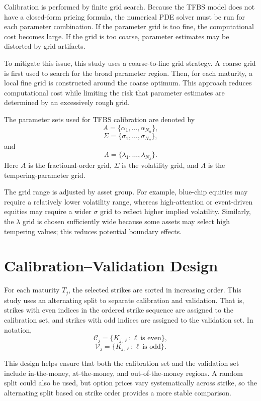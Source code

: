 \documentclass[11pt,a4paper]{report}
\begin{document}
Calibration is performed by finite grid search. Because the TFBS model does not have a closed-form pricing formula, the numerical PDE solver must be run for each parameter combination. If the parameter grid is too fine, the computational cost becomes large. If the grid is too coarse, parameter estimates may be distorted by grid artifacts.

To mitigate this issue, this study uses a coarse-to-fine grid strategy. A coarse grid is first used to search for the broad parameter region. Then, for each maturity, a local fine grid is constructed around the coarse optimum. This approach reduces computational cost while limiting the risk that parameter estimates are determined by an excessively rough grid.

The parameter sets used for TFBS calibration are denoted by
\[
A=\{\alpha_1,\dots,\alpha_{N_\alpha}\},
\]
\[
\Sigma=\{\sigma_1,\dots,\sigma_{N_\sigma}\},
\]
and
\[
\Lambda=\{\lambda_1,\dots,\lambda_{N_\lambda}\}.
\]
Here $A$ is the fractional-order grid, $\Sigma$ is the volatility grid, and $\Lambda$ is the tempering-parameter grid.

The grid range is adjusted by asset group. For example, blue-chip equities may require a relatively lower volatility range, whereas high-attention or event-driven equities may require a wider $\sigma$ grid to reflect higher implied volatility. Similarly, the $\lambda$ grid is chosen sufficiently wide because some assets may select high tempering values; this reduces potential boundary effects.

\section{Calibration--Validation Design}

For each maturity $T_j$, the selected strikes are sorted in increasing order. This study uses an alternating split to separate calibration and validation. That is, strikes with even indices in the ordered strike sequence are assigned to the calibration set, and strikes with odd indices are assigned to the validation set. In notation,
\[
\mathcal{C}_j
=
\{K_{j,\ell}:\ell\ \text{is even}\},
\]
\[
\mathcal{V}_j
=
\{K_{j,\ell}:\ell\ \text{is odd}\}.
\]

This design helps ensure that both the calibration set and the validation set include in-the-money, at-the-money, and out-of-the-money regions. A random split could also be used, but option prices vary systematically across strike, so the alternating split based on strike order provides a more stable comparison.
\end{document}
